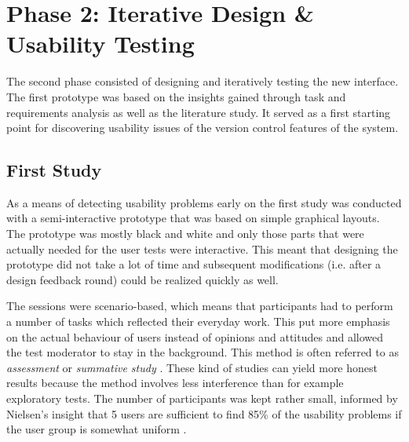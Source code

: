 

\section{Phase 2: Iterative Design \& Usability Testing}
The second phase consisted of designing and iteratively testing the new interface. The first prototype was based on the insights gained through task and requirements analysis as well as the literature study. It served as a first starting point for discovering usability issues of the version control features of the system.



\subsection{First Study}
As a means of detecting usability problems early on the first study was conducted with a semi-interactive prototype that was based on simple graphical layouts. The prototype was mostly black and white and only those parts that were actually needed for the user tests were interactive. This meant that designing the prototype did not take a lot of time and subsequent modifications (i.e. after a design feedback round) could be realized quickly as well.

The sessions were scenario-based, which means that participants had to perform a number of tasks which reflected their everyday work. This put more emphasis on the actual behaviour of users instead of opinions and attitudes and allowed the test moderator to stay in the background. This method is often referred to as \textit{assessment} or \textit{summative study} \cite{rubin_handbook_2008} \cite{goodman_observing_2012}. These kind of studies can yield more honest results because the method involves less interference than for example exploratory tests. The number of participants was kept rather small, informed by Nielsen's insight that 5 users are sufficient to find 85\% of the usability problems if the user group is somewhat uniform \cite{nielsen_why_2000}.

